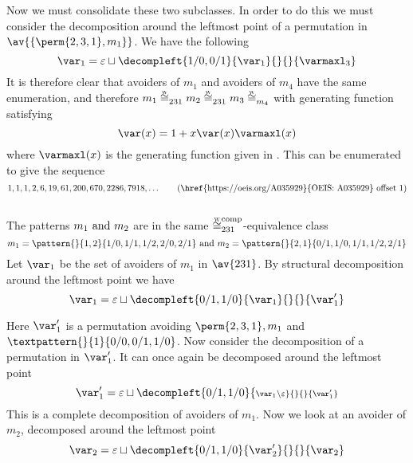 Now we must consolidate these two subclasses. In order to do this we must
consider the decomposition around the leftmost point of a permutation in
\(\av{\{\perm{2,3,1},m_1\}}\). We have the following
\begin{equation*}
    \scriptvar_1 = \varepsilon \sqcup
    \decompleft{1/0,0/1}{\scriptvar_1}{}{}{\mathcal{\varmaxl}_3}
\end{equation*}
It is therefore clear that avoiders of \(m_1\) and avoiders of \(m_4\) have the
same enumeration, and therefore \(m_1 \weqv{231} m_2 \weqv{231}m_3\weqv{m_4}\)
with generating function satisfying
\begin{equation*}
    \var(x) = 1 + x\var(x)\varmaxl(x)
\end{equation*}
where \(\varmaxl(x)\) is the generating function given in .
This can be enumerated to give the sequence
\begin{equation*}
    1, 1, 1, 2, 6, 19, 61, 200, 670, 2286, 7918,\dotsc \tag{\href{https://oeis.org/A035929}{OEIS: A035929} offset 1}
\end{equation*}

\subsection{}
\nextvar
The patterns \(m_1 \text{ and } m_2\) are in the same \(\weqv[comp]{231}\)-equivalence class
\begin{equation*}
    m_1 = \pattern{}{1,2}{1/0,1/1,1/2,2/0,2/1} \text{ and }
    m_2 = \pattern{}{2,1}{0/1,1/0,1/1,1/2,2/1}
\end{equation*}
Let \(\scriptvar_1\) be the set of avoiders of \(m_1\) in \(\av{231}\). By
structural decomposition around the leftmost point we have
\begin{equation*}
    \scriptvar_1 = \varepsilon \sqcup
    \decompleft{0/1,1/0}{\scriptvar_1}{}{}{\scriptvar^\prime_1}
\end{equation*}

\noindent
Here \(\scriptvar^\prime_1\) is a permutation avoiding \(\perm{2,3,1}, m_1\) and
\(\textpattern{}{1}{0/0,0/1,1/0}\). Now consider the decomposition of a
permutation in \(\scriptvar^\prime_1\). It can once again be decomposed around
the leftmost point
\begin{equation*}
    \scriptvar^\prime_1 = \varepsilon \sqcup
    \decompleft{0/1,1/0}{\scriptstyle \scriptvar_1\setminus\varepsilon}{}{}{\scriptvar^\prime_1}
\end{equation*}
This is a complete decomposition of avoiders of \(m_1\). Now we look at an
avoider of \(m_2\), decomposed around the leftmost point
\begin{equation*}
    \scriptvar_2 = \varepsilon \sqcup
    \decompleft{0/1,1/0}{\scriptvar^\prime_2}{}{}{\scriptvar_2}
\end{equation*}

